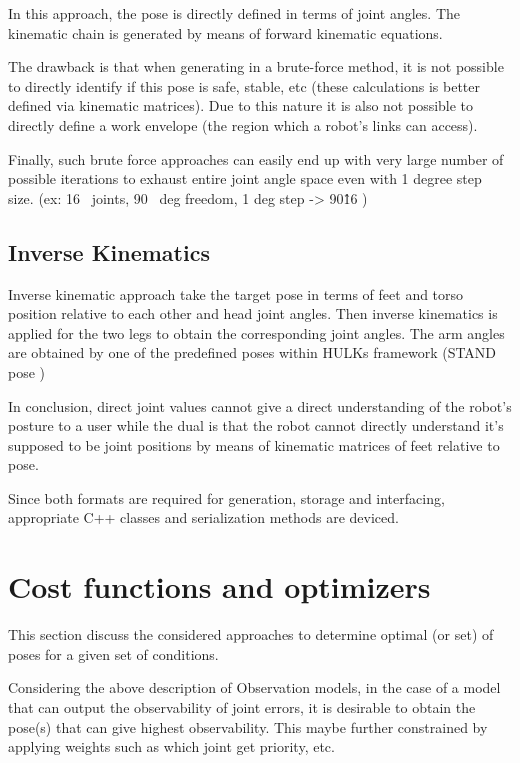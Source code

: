 \documentclass[english, printversion, nomenclature, notitle]{tuvisionthesis} %
\begin{document}
In this approach, the pose is directly defined in terms of joint angles. The kinematic chain is generated by means of forward kinematic equations.

The drawback is that when generating in a brute-force method, it is not possible to directly identify if this pose is safe, stable, etc (these calculations is better defined via kinematic matrices). Due to this nature it is also not possible to directly define a work envelope (the region which a robot's links can access).

Finally, such brute force approaches can easily end up with very large number of possible iterations to exhaust entire joint angle space even with 1 degree step size. (ex: 16~ joints, 90~ deg freedom, 1 deg step -> 90\^16 ) 

\subsection{Inverse Kinematics}

Inverse kinematic approach take the target pose in terms of feet and torso position relative to each other and head joint angles. Then inverse kinematics is applied for the two legs to obtain the corresponding joint angles. The arm angles are obtained by one of the predefined poses within HULKs framework (STAND pose )

In conclusion, direct joint values cannot give a direct understanding of the robot's posture to a user while the dual is that the robot cannot directly understand it's supposed to be joint positions by means of kinematic matrices of feet relative to pose. 

Since both formats are required for generation, storage and interfacing, appropriate C++ classes and serialization methods are deviced.


\section{Cost functions and optimizers}

This section discuss the considered approaches to determine optimal (or set) of poses for a given set of conditions.

Considering the above description of Observation models, in the case of a model that can output the observability of joint errors, it is desirable to obtain the pose(s) that can give highest observability. This maybe further constrained by applying weights such as which joint get priority, etc.
\end{document}
